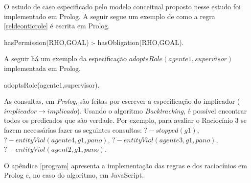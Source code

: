 O estudo de caso especificado pelo modelo conceitual proposto nesse estudo foi implementado em Prolog. A seguir segue um exemplo de como a regra \ref{reldeonticrole} é escrita em Prolog.

hasPermission(RHO,GOAL) :- hasObligation(RHO,GOAL).

A seguir há um exemplo da especificação $adoptsRole(agente1,supervisor)$ implementada em Prolog.

adoptsRole(agente1,supervisor).

As consultas, em \textit{Prolog}, são feitas por escrever a especificação do implicador ($implicador \to implicado$). Usando o algoritmo \textit{Backtracking}, é possível encontrar todos os predicados que são verdade. Por exemplo, para avaliar o Raciocínio 3 se fazem necessárias fazer as seguintes consultas: $? - stopped(g1)$, $? - entityViol(agente4,g1,pano)$, $? - entityViol(agente3,g1,pano)$, $? - entityViol(agent2,g1,pano)$. 

O apêndice \ref{program} apresenta a implementação das regras e dos raciocínios em Prolog e, no caso do algoritmo, em JavaScript.
